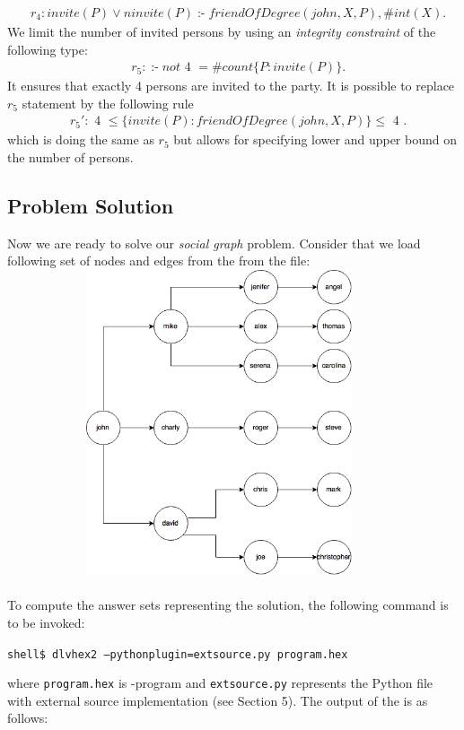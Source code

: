 \documentclass[14pt,a4paper, titlepage]{article}
\DeclareMathOperator{\leftimpl}{:-}
\begin{document}
\begin{align*}
& r_4: \mathit{invite(P)} \vee \mathit{ninvite(P) \leftimpl friendOfDegree(john,X,P), \#int(X).}
\end{align*}     
We limit the number of invited persons by using an \emph{integrity constraint} of the following type:
\begin{align*}
& r_5 \colon \leftimpl \mathit{not} \text{ 4 } = \mathit{\#count} \{ P : \mathit{invite(P)} \}.
\end{align*} 
It ensures that exactly 4 persons are invited to the party. It is possible to replace $r_5$ statement by the following rule
\begin{align*}
& r_{5}\prime \colon \text{ 4 } \leq \{ invite(P) : friendOfDegree(john,X,P) \} \leq \text{ 4 }. 
\end{align*}
which is doing the same as $r_5$ but allows for specifying lower and upper bound on the number of persons.
  

\subsection{Problem Solution}
Now we are ready to solve our \emph{social graph} problem. Consider that we load following set of nodes and edges from the from the file:\\
\includegraphics[width=12.5cm,height=9cm]{graph}
\\ \\To compute the answer sets representing 
the solution, the following command is to be invoked:
\\ \centerline{\texttt{shell\$ dlvhex2 --pythonplugin=extsource.py program.hex}}
where \texttt{program.hex} is \hex-program and \texttt{extsource.py} represents the Python file with 
external source implementation (see Section 5). The output of the \dlvhex{} is as follows:
\end{document}
